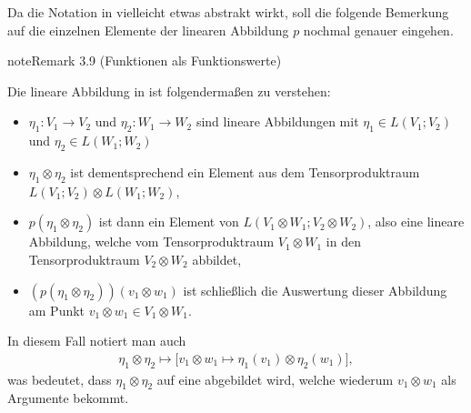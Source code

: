 \documentclass[letterpaper,10pt,german]{jupyterBook}
\begin{document}
\sphinxAtStartPar
Da die Notation in {\hyperref[\detokenize{vektoranalysis/tensor:lem:LISO}]{}} vielleicht etwas abstrakt wirkt, soll die folgende Bemerkung auf die einzelnen Elemente der linearen Abbildung \(p\) nochmal genauer eingehen.
\label{vektoranalysis/tensor:remark-14}
\begin{sphinxadmonition}{note}{Remark 3.9 (Funktionen als Funktionswerte)}



\sphinxAtStartPar
Die lineare Abbildung in {\hyperref[\detokenize{vektoranalysis/tensor:lem:LISO}]{}} ist folgendermaßen zu verstehen:
\begin{itemize}
\item {} 
\sphinxAtStartPar
\(\eta_1:V_1\rightarrow V_2\) und \(\eta_2: W_1 \rightarrow W_2\) sind lineare Abbildungen mit \(\eta_1 \in L(V_1; V_2)\) und \(\eta_2 \in L(W_1; W_2)\)

\item {} 
\sphinxAtStartPar
\(\eta_1 \otimes \eta_2\) ist dementsprechend ein Element aus dem Tensorproduktraum \(L(V_1; V_2)\otimes L(W_1; W_2)\),

\item {} 
\sphinxAtStartPar
\(p(\eta_1\otimes\eta_2)\) ist dann ein Element von \(L(V_1\otimes W_1; V_2\otimes W_2)\), also eine lineare Abbildung, welche vom Tensorproduktraum \(V_1\otimes W_1\) in den Tensorproduktraum \(V_2\otimes W_2\) abbildet,

\item {} 
\sphinxAtStartPar
\((p(\eta_1\otimes\eta_2))(v_1\otimes w_1)\) ist schließlich die Auswertung dieser Abbildung am Punkt \(v_1\otimes w_1\in V_1\otimes W_1\).

\end{itemize}

\sphinxAtStartPar
In diesem Fall notiert man auch
\begin{equation*}
\begin{split}\eta_1\otimes\eta_2 \mapsto 
\big[
v_1\otimes w_1\mapsto \eta_1(v_1) \otimes \eta_2(w_1)
\big],\end{split}
\end{equation*}
\sphinxAtStartPar
was bedeutet, dass \(\eta_1\otimes\eta_2\) auf eine  abgebildet wird, welche wiederum \(v_1\otimes w_1\) als Argumente bekommt.
\end{sphinxadmonition}
\end{document}
